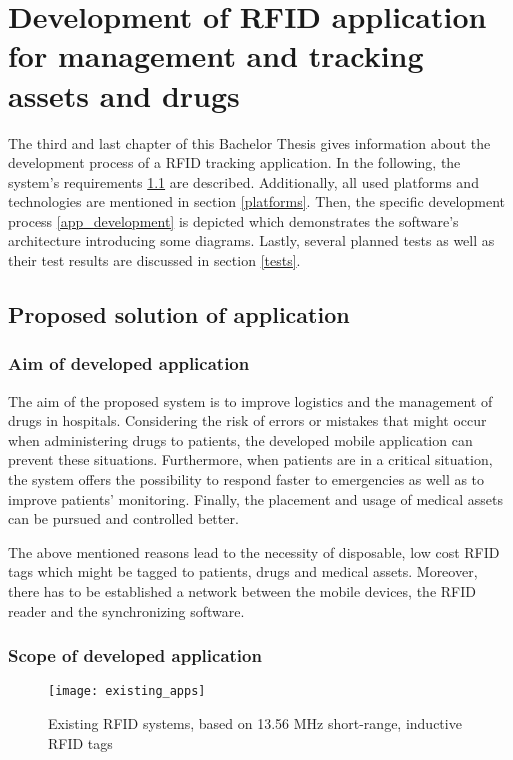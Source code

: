\chapter{Development of RFID application for management and tracking assets and drugs}
\label{Kap3}

The third and last chapter of this Bachelor Thesis gives information about the development process of a RFID tracking application. In the following, the system's requirements \ref{requirements} are described. Additionally, all used platforms and technologies are mentioned in section \ref{platforms}. Then, the specific development process \ref{app_development} is depicted which demonstrates the software's architecture introducing some diagrams. Lastly, several planned tests as well as their test results are discussed in section \ref{tests}.

\section{Proposed solution of application}\label{requirements}

\subsection{Aim of developed application}

The aim of the proposed system is to improve logistics and the management of drugs in hospitals. Considering the risk of errors or mistakes that might occur when administering drugs to patients, the developed mobile application can prevent these situations. Furthermore, when patients are in a critical situation, the system offers the possibility to respond faster to emergencies as well as to improve patients' monitoring. Finally, the placement and usage of medical assets can be pursued and controlled better. 

The above mentioned reasons lead to the necessity of disposable, low cost RFID tags which might be tagged to patients, drugs and medical assets. Moreover, there has to be established a network between the mobile devices, the RFID reader and the synchronizing software. 

\subsection{Scope of developed application}

\begin{figure}
\centering
\texttt{[image: existing\_apps]} 
\caption{\label{fig:existing_apps} Existing RFID systems, based on 13.56 MHz short-range, inductive RFID tags} 
\end{figure}

